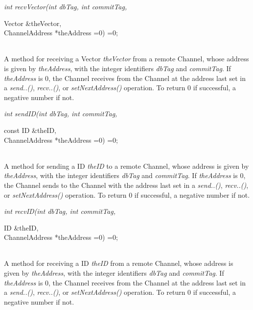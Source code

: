 {\em int recvVector(int dbTag, int commitTag, 

\indent\indent\indent\indent\indent Vector \&theVector,  \\
\indent\indent\indent\indent\indent ChannelAddress *theAddress =0) =0;}\\
A method for receiving a Vector {\em theVector} from a
remote Channel, whose address is given by {\em theAddress}, with the
integer identifiers {\em dbTag} and {\em commitTag}. If {\em theAddress} 
is $0$, the Channel receives from the Channel at the address last set
in a {\em send..()}, {\em recv..()}, or {\em setNextAddress()}
operation. To return $0$ if successful, a negative number if not. \\ 

{\em int sendID(int dbTag, int commitTag,  

\indent\indent\indent\indent\indent const ID \&theID, \\
\indent\indent\indent\indent\indent ChannelAddress *theAddress =0) =0;}\\
A method for sending a ID {\em theID} to a
remote Channel, whose address is given by {\em theAddress}, with the
integer identifiers {\em dbTag} and {\em commitTag}. If {\em theAddress} 
is $0$, the Channel sends to the Channel with the address last set in
a {\em send..()}, {\em recv..()}, or {\em setNextAddress()}
operation. To return $0$ if successful, a negative number if not. \\ 


{\em int recvID(int dbTag, int commitTag, 

\indent\indent\indent\indent\indent ID \&theID,  \\
\indent\indent\indent\indent\indent ChannelAddress *theAddress =0) =0;}\\
A method for receiving a ID {\em theID} from a
remote Channel, whose address is given by {\em theAddress}, with the
integer identifiers {\em dbTag} and {\em commitTag}. If {\em theAddress} 
is $0$, the Channel receives from the Channel at the address last set
in a {\em send..()}, {\em recv..()}, or {\em setNextAddress()}
operation. To return $0$ if successful, a negative number if not.


